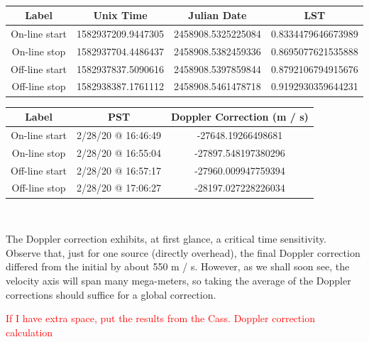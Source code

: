 \documentclass[12pt]{article}
\begin{document}
\

\begin{center}
 \begin{tabular}{||c c c c||} 
 \hline
 Label & Unix Time & Julian Date & LST \\ [0.5ex] 
 \hline
 On-line start & 1582937209.9447305 & 2458908.5325225084 & 0.8334479646673989 \\ 
 \hline
 On-line stop & 1582937704.4486437 & 2458908.5382459336 & 0.8695077621535888 \\
 \hline
 Off-line start & 1582937837.5090616 & 2458908.5397859844 & 0.8792106794915676 \\
 \hline
 Off-line stop & 1582938387.1761112 & 2458908.5461478718 & 0.9192930359644231 \\ [1ex] 
 \hline
\end{tabular}
\end{center}

\begin{center}
 \begin{tabular}{||c c c||} 
 \hline
 Label & PST & Doppler Correction (m / s)\\ [0.5ex] 
 \hline
 On-line start & 2/28/20 @ 16:46:49 & -27648.19266498681 \\ 
 \hline
 On-line stop & 2/28/20 @ 16:55:04 & -27897.548197380296 \\
 \hline
 Off-line start & 2/28/20 @ 16:57:17 & -27960.009947759394 \\
 \hline
 Off-line stop & 2/28/20 @ 17:06:27 & -28197.027228226034 \\ [1ex] 
 \hline
\end{tabular}
\end{center}

\

The Doppler correction exhibits, at first glance, a critical time sensitivity. Observe that, just for one source (directly overhead), the final Doppler correction differed from the initial by about 550 m / s. However, as we shall soon see, the velocity axis will span many mega-meters, so taking the average of the Doppler corrections should suffice for a global correction.

\textcolor{red}{If I have extra space, put the results from the Cass. Doppler correction calculation}

\
\end{document}
